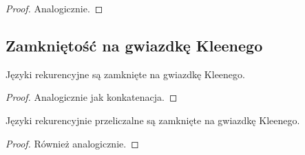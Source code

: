 \begin{proof}
	Analogicznie.
\end{proof}

\subsection{Zamkniętość na gwiazdkę Kleenego}

\begin{theorem}
	Języki rekurencyjne są zamknięte na gwiazdkę Kleenego.
\end{theorem}

\begin{proof}
	Analogicznie jak konkatenacja.
\end{proof}

\begin{theorem}
	Języki rekurencyjnie przeliczalne są zamknięte na gwiazdkę Kleenego.
\end{theorem}

\begin{proof}
	Również analogicznie.
\end{proof}